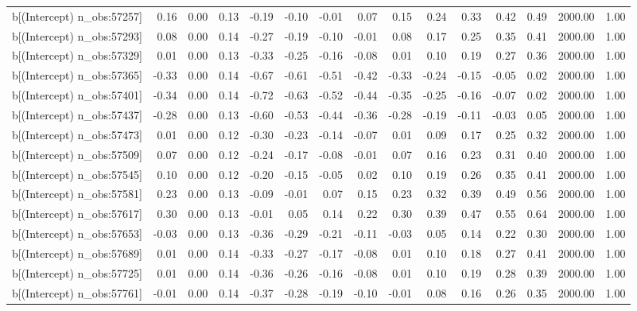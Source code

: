 \begin{table}[ht]
\begin{tabular}{rrrrrrrrrrrrrrr}
  b[(Intercept) n\_obs:57257] & 0.16 & 0.00 & 0.13 & -0.19 & -0.10 & -0.01 & 0.07 & 0.15 & 0.24 & 0.33 & 0.42 & 0.49 & 2000.00 & 1.00 \\ 
  b[(Intercept) n\_obs:57293] & 0.08 & 0.00 & 0.14 & -0.27 & -0.19 & -0.10 & -0.01 & 0.08 & 0.17 & 0.25 & 0.35 & 0.41 & 2000.00 & 1.00 \\ 
  b[(Intercept) n\_obs:57329] & 0.01 & 0.00 & 0.13 & -0.33 & -0.25 & -0.16 & -0.08 & 0.01 & 0.10 & 0.19 & 0.27 & 0.36 & 2000.00 & 1.00 \\ 
  b[(Intercept) n\_obs:57365] & -0.33 & 0.00 & 0.14 & -0.67 & -0.61 & -0.51 & -0.42 & -0.33 & -0.24 & -0.15 & -0.05 & 0.02 & 2000.00 & 1.00 \\ 
  b[(Intercept) n\_obs:57401] & -0.34 & 0.00 & 0.14 & -0.72 & -0.63 & -0.52 & -0.44 & -0.35 & -0.25 & -0.16 & -0.07 & 0.02 & 2000.00 & 1.00 \\ 
  b[(Intercept) n\_obs:57437] & -0.28 & 0.00 & 0.13 & -0.60 & -0.53 & -0.44 & -0.36 & -0.28 & -0.19 & -0.11 & -0.03 & 0.05 & 2000.00 & 1.00 \\ 
  b[(Intercept) n\_obs:57473] & 0.01 & 0.00 & 0.12 & -0.30 & -0.23 & -0.14 & -0.07 & 0.01 & 0.09 & 0.17 & 0.25 & 0.32 & 2000.00 & 1.00 \\ 
  b[(Intercept) n\_obs:57509] & 0.07 & 0.00 & 0.12 & -0.24 & -0.17 & -0.08 & -0.01 & 0.07 & 0.16 & 0.23 & 0.31 & 0.40 & 2000.00 & 1.00 \\ 
  b[(Intercept) n\_obs:57545] & 0.10 & 0.00 & 0.12 & -0.20 & -0.15 & -0.05 & 0.02 & 0.10 & 0.19 & 0.26 & 0.35 & 0.41 & 2000.00 & 1.00 \\ 
  b[(Intercept) n\_obs:57581] & 0.23 & 0.00 & 0.13 & -0.09 & -0.01 & 0.07 & 0.15 & 0.23 & 0.32 & 0.39 & 0.49 & 0.56 & 2000.00 & 1.00 \\ 
  b[(Intercept) n\_obs:57617] & 0.30 & 0.00 & 0.13 & -0.01 & 0.05 & 0.14 & 0.22 & 0.30 & 0.39 & 0.47 & 0.55 & 0.64 & 2000.00 & 1.00 \\ 
  b[(Intercept) n\_obs:57653] & -0.03 & 0.00 & 0.13 & -0.36 & -0.29 & -0.21 & -0.11 & -0.03 & 0.05 & 0.14 & 0.22 & 0.30 & 2000.00 & 1.00 \\ 
  b[(Intercept) n\_obs:57689] & 0.01 & 0.00 & 0.14 & -0.33 & -0.27 & -0.17 & -0.08 & 0.01 & 0.10 & 0.18 & 0.27 & 0.41 & 2000.00 & 1.00 \\ 
  b[(Intercept) n\_obs:57725] & 0.01 & 0.00 & 0.14 & -0.36 & -0.26 & -0.16 & -0.08 & 0.01 & 0.10 & 0.19 & 0.28 & 0.39 & 2000.00 & 1.00 \\ 
  b[(Intercept) n\_obs:57761] & -0.01 & 0.00 & 0.14 & -0.37 & -0.28 & -0.19 & -0.10 & -0.01 & 0.08 & 0.16 & 0.26 & 0.35 & 2000.00 & 1.00 \\ 

\end{tabular}
\end{table}
